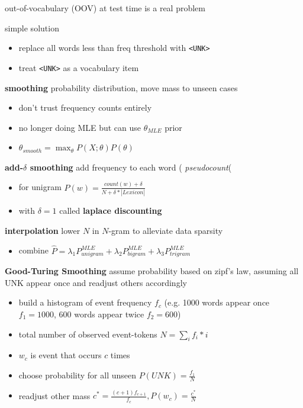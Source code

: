 \documentclass[]{article}
\theoremstyle{definition}
\begin{document}
out-of-vocabulary (OOV) at test time is a real problem

simple solution
\begin{itemize}
    \item replace all words less than freq threshold with \texttt{<UNK>}
    \item treat \texttt{<UNK>} as a vocabulary item
\end{itemize}

\textbf{smoothing} probability distribution, move mass to unseen cases
\begin{itemize}
    \item don't trust frequency counts entirely
    \item no longer doing MLE but can use $\theta_{MLE}$ prior
    \item $\theta_{smooth} = \max_\theta P(X;\theta)P(\theta) $
\end{itemize}

\textbf{add-$\delta$ smoothing} add frequency to each word ( \textit{pseudocount}(
\begin{itemize}
    \item for unigram $P(w) = \frac{count(w) + \delta}{N+\delta *|Lexicon|}$
    \item with $\delta=1$ called \textbf{laplace discounting}
\end{itemize}

\textbf{interpolation} lower $N$ in $N$-gram to alleviate data sparsity
\begin{itemize}
    \item combine $\hat P = \lambda_1 P_{unigram}^{MLE} + \lambda_2 P_{bigram}^{MLE} + \lambda_3 P_{trigram}^{MLE}$
\end{itemize}

\textbf{Good-Turing Smoothing} assume probability based on zipf's law, assuming all UNK appear once and readjust others accordingly
\begin{itemize}
    \item build a histogram of event frequency $f_c$ (e.g. 1000 words appear once $f_1 = 1000$, 600 words appear twice $f_2 = 600$)
    \item total number of observed event-tokens $N = \sum_i f_i * i$
    \item $w_c$ is event that occurs $c$ times
    \item choose probability for all unseen $P(UNK) = \frac{f_1}{N}$
    \item readjust other mass $c^* = \frac{(c+1)f_{c+1}}{f_c},P(w_c) = \frac{c^*}{N}$
\end{itemize}
\end{document}
